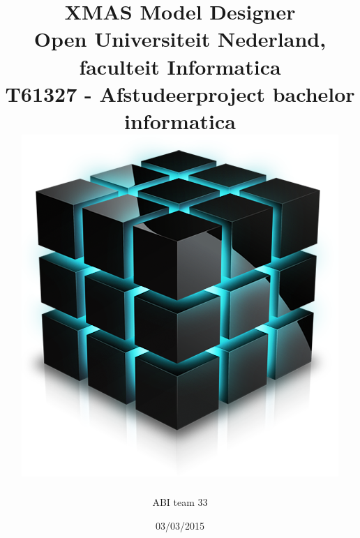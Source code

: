 \documentclass[a4paper,11pt]{report}
\author{ABI team 33}
\date{03/03/2015}
\title{
	{\color{blue}XMAS Model Designer}\\
	{\large Open Universiteit Nederland, faculteit Informatica}\\
	{\small T61327 - Afstudeerproject bachelor informatica}\\
	\vspace{1cm}
	{\includegraphics[width=.25\textwidth]{xmd}}
}
\begin{document}


\nowidow%

\newcommand{\xmas}{x\textsc{mas}}%
\newcommand{\ok}{$\checkmark$}
\newcommand{\w}[1]{\textbf{\textsc{#1}}}
\newcommand\bw[1]{{\color{blue}#1}}
\newcommand{\Noc}{\textsc{NoC}\xspace}%
\newcommand{\mybox}[1]{\begin{boxedminipage}[t]{\textwidth}#1\end{boxedminipage}}




\newcommand\smp[1]{%
	\marginpar{\color{blue}\small\bf\textsc#1}
}%
\newcommand\smpp[1]{\smp{#1}#1}


\maketitle
\end{document}
